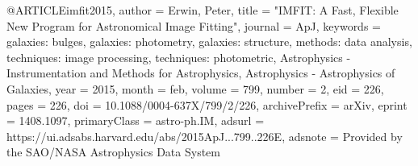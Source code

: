 
@ARTICLE{imfit2015,
       author = {{Erwin}, Peter},
        title = "{IMFIT: A Fast, Flexible New Program for Astronomical Image Fitting}",
      journal = {ApJ},
     keywords = {galaxies: bulges, galaxies: photometry, galaxies: structure, methods: data analysis, techniques: image processing, techniques: photometric, Astrophysics - Instrumentation and Methods for Astrophysics, Astrophysics - Astrophysics of Galaxies},
         year = 2015,
        month = feb,
       volume = {799},
       number = {2},
          eid = {226},
        pages = {226},
          doi = {10.1088/0004-637X/799/2/226},
archivePrefix = {arXiv},
       eprint = {1408.1097},
 primaryClass = {astro-ph.IM},
       adsurl = {https://ui.adsabs.harvard.edu/abs/2015ApJ...799..226E},
      adsnote = {Provided by the SAO/NASA Astrophysics Data System}
}
